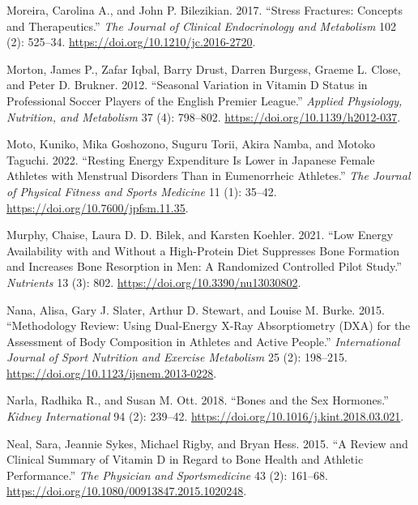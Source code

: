 \documentclass[
]{article}
\newlength{\cslhangindent}
\newenvironment{CSLReferences}[2] %
 {\begin{list}{}{%
  \setlength{\itemindent}{0pt}
  \setlength{\leftmargin}{0pt}
  \setlength{\parsep}{0pt}
  \ifodd #1
   \setlength{\leftmargin}{\cslhangindent}
   \setlength{\itemindent}{-1\cslhangindent}
  \fi
  \setlength{\itemsep}{#2\baselineskip}}}
 {\end{list}}
\begin{document}
\begin{CSLReferences}{1}{0}
Moreira, Carolina A., and John P. Bilezikian. 2017. {``Stress {Fractures}: {Concepts} and {Therapeutics}.''} \emph{The Journal of Clinical Endocrinology and Metabolism} 102 (2): 525--34. \url{https://doi.org/10.1210/jc.2016-2720}.

Morton, James P., Zafar Iqbal, Barry Drust, Darren Burgess, Graeme L. Close, and Peter D. Brukner. 2012. {``Seasonal Variation in Vitamin {D} Status in Professional Soccer Players of the {English} {Premier} {League}.''} \emph{Applied Physiology, Nutrition, and Metabolism} 37 (4): 798--802. \url{https://doi.org/10.1139/h2012-037}.

Moto, Kuniko, Mika Goshozono, Suguru Torii, Akira Namba, and Motoko Taguchi. 2022. {``Resting Energy Expenditure Is Lower in {Japanese} Female Athletes with Menstrual Disorders Than in Eumenorrheic Athletes.''} \emph{The Journal of Physical Fitness and Sports Medicine} 11 (1): 35--42. \url{https://doi.org/10.7600/jpfsm.11.35}.

Murphy, Chaise, Laura D. D. Bilek, and Karsten Koehler. 2021. {``Low {Energy} {Availability} with and Without a {High}-{Protein} {Diet} {Suppresses} {Bone} {Formation} and {Increases} {Bone} {Resorption} in {Men}: {A} {Randomized} {Controlled} {Pilot} {Study}.''} \emph{Nutrients} 13 (3): 802. \url{https://doi.org/10.3390/nu13030802}.

Nana, Alisa, Gary J. Slater, Arthur D. Stewart, and Louise M. Burke. 2015. {``Methodology Review: Using Dual-Energy {X}-Ray Absorptiometry ({DXA}) for the Assessment of Body Composition in Athletes and Active People.''} \emph{International Journal of Sport Nutrition and Exercise Metabolism} 25 (2): 198--215. \url{https://doi.org/10.1123/ijsnem.2013-0228}.

Narla, Radhika R., and Susan M. Ott. 2018. {``Bones and the Sex Hormones.''} \emph{Kidney International} 94 (2): 239--42. \url{https://doi.org/10.1016/j.kint.2018.03.021}.

Neal, Sara, Jeannie Sykes, Michael Rigby, and Bryan Hess. 2015. {``A Review and Clinical Summary of Vitamin {D} in Regard to Bone Health and Athletic Performance.''} \emph{The Physician and Sportsmedicine} 43 (2): 161--68. \url{https://doi.org/10.1080/00913847.2015.1020248}.


\end{CSLReferences}
\end{document}
